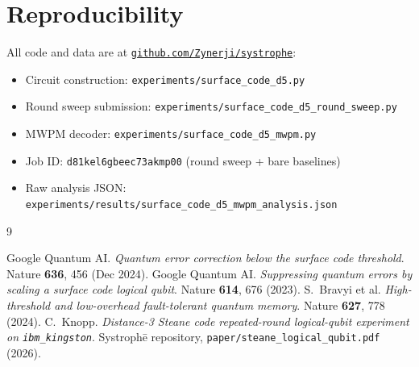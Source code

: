 \documentclass[11pt,letterpaper]{article}
\providecommand{\Systrophe}{Systroph\=e}
\begin{document}
\section{Reproducibility}

All code and data are at \href{https://github.com/Zynerji/systrophe}{\texttt{github.com/Zynerji/systrophe}}:

\begin{itemize}[leftmargin=*,itemsep=0pt]
\item Circuit construction: \texttt{experiments/surface\_code\_d5.py}
\item Round sweep submission: \texttt{experiments/surface\_code\_d5\_round\_sweep.py}
\item MWPM decoder: \texttt{experiments/surface\_code\_d5\_mwpm.py}
\item Job ID: \texttt{d81kel6gbeec73akmp00} (round sweep + bare baselines)
\item Raw analysis JSON: \texttt{experiments/results/surface\_code\_d5\_mwpm\_analysis.json}
\end{itemize}

\begin{thebibliography}{9}

 Google Quantum AI. \emph{Quantum error correction below the surface code threshold}. Nature \textbf{636}, 456 (Dec 2024).
 Google Quantum AI. \emph{Suppressing quantum errors by scaling a surface code logical qubit}. Nature \textbf{614}, 676 (2023).
 S.~Bravyi et al. \emph{High-threshold and low-overhead fault-tolerant quantum memory}. Nature \textbf{627}, 778 (2024).
 C.~Knopp. \emph{Distance-3 Steane code repeated-round logical-qubit experiment on \texttt{ibm\_kingston}}. \Systrophe{} repository, \texttt{paper/steane\_logical\_qubit.pdf} (2026).

\end{thebibliography}
\end{document}
